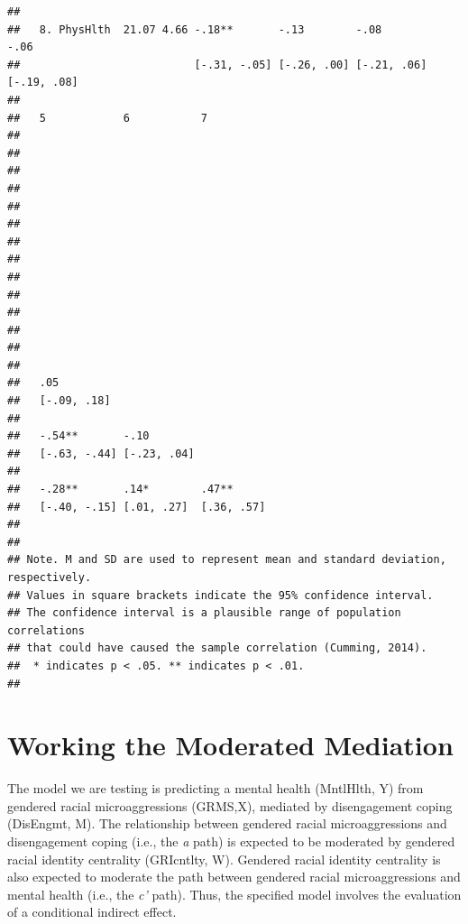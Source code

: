 \documentclass[
  english,
]{book}
\begin{document}
\begin{verbatim}
##                                                                             
##   8. PhysHlth  21.07 4.66 -.18**       -.13        -.08         -.06        
##                           [-.31, -.05] [-.26, .00] [-.21, .06]  [-.19, .08] 
##                                                                             
##   5            6           7         
##                                      
##                                      
##                                      
##                                      
##                                      
##                                      
##                                      
##                                      
##                                      
##                                      
##                                      
##                                      
##                                      
##                                      
##   .05                                
##   [-.09, .18]                        
##                                      
##   -.54**       -.10                  
##   [-.63, -.44] [-.23, .04]           
##                                      
##   -.28**       .14*        .47**     
##   [-.40, -.15] [.01, .27]  [.36, .57]
##                                      
## 
## Note. M and SD are used to represent mean and standard deviation, respectively.
## Values in square brackets indicate the 95% confidence interval.
## The confidence interval is a plausible range of population correlations 
## that could have caused the sample correlation (Cumming, 2014).
##  * indicates p < .05. ** indicates p < .01.
## 
\end{verbatim}

\hypertarget{working-the-moderated-mediation}{%
\section{Working the Moderated Mediation}\label{working-the-moderated-mediation}}

The model we are testing is predicting a mental health (MntlHlth, Y) from gendered racial microaggressions (GRMS,X), mediated by disengagement coping (DisEngmt, M). The relationship between gendered racial microaggressions and disengagement coping (i.e., the \emph{a} path) is expected to be moderated by gendered racial identity centrality (GRIcntlty, W). Gendered racial identity centrality is also expected to moderate the path between gendered racial microaggressions and mental health (i.e., the \emph{c'} path). Thus, the specified model involves the evaluation of a conditional indirect effect.
\end{document}
